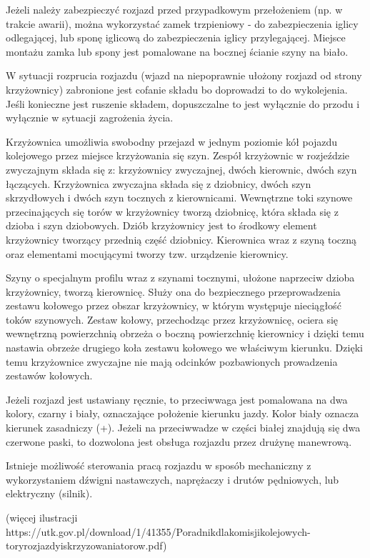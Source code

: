Jeżeli należy zabezpieczyć rozjazd przed przypadkowym przełożeniem (np. w trakcie awarii), można wykorzystać zamek trzpieniowy - do zabezpieczenia iglicy odlegającej, lub sponę iglicową do zabezpieczenia iglicy przylegającej. Miejsce montażu zamka lub spony jest pomalowane na bocznej ścianie szyny na biało.

W sytuacji rozprucia rozjazdu (wjazd na niepoprawnie ułożony rozjazd od strony krzyżownicy) zabronione jest cofanie składu bo doprowadzi to do wykolejenia. Jeśli konieczne jest ruszenie składem, dopuszczalne to jest wyłącznie do przodu i wyłącznie w sytuacji zagrożenia życia.

Krzyżownica umożliwia swobodny przejazd w jednym poziomie kół pojazdu kolejowego przez miejsce krzyżowania się szyn.
Zespół krzyżownic w rozjeździe zwyczajnym składa się z:
krzyżownicy zwyczajnej, dwóch kierownic, dwóch szyn łączących.
Krzyżownica zwyczajna składa się z dziobnicy, dwóch szyn skrzydłowych i dwóch szyn tocznych z kierownicami. Wewnętrzne toki szynowe przecinających się torów w krzyżownicy tworzą
dziobnicę, która składa się z dzioba i szyn dziobowych. Dziób krzyżownicy jest to środkowy element
krzyżownicy tworzący przednią część dziobnicy. Kierownica wraz z szyną toczną oraz elementami
mocującymi tworzy tzw. urządzenie kierownicy.

Szyny o specjalnym profilu wraz z szynami tocznymi, ułożone naprzeciw dzioba krzyżownicy, tworzą kierownicę.
Służy ona do bezpiecznego przeprowadzenia zestawu kołowego przez obszar krzyżownicy, w którym występuje nieciągłość toków szynowych.  Zestaw kołowy, przechodząc przez krzyżownicę, ociera się wewnętrzną
powierzchnią obrzeża o boczną powierzchnię kierownicy i dzięki temu nastawia obrzeże drugiego koła zestawu kołowego we właściwym kierunku. Dzięki temu krzyżownice zwyczajne nie mają odcinków pozbawionych prowadzenia zestawów kołowych.

Jeżeli rozjazd jest ustawiany ręcznie, to przeciwwaga jest pomalowana na dwa kolory, czarny i biały, oznaczające położenie kierunku jazdy. Kolor biały oznacza kierunek zasadniczy (+). Jeżeli na przeciwwadze w części białej znajdują się dwa czerwone paski, to dozwolona jest obsługa rozjazdu przez drużynę manewrową.

Istnieje możliwość sterowania pracą rozjazdu w sposób mechaniczny z wykorzystaniem dźwigni nastawczych, naprężaczy i drutów pędniowych, lub elektryczny (silnik).

(więcej ilustracji https://utk.gov.pl/download/1/41355/Poradnikdlakomisjikolejowych-toryrozjazdyiskrzyzowaniatorow.pdf)

